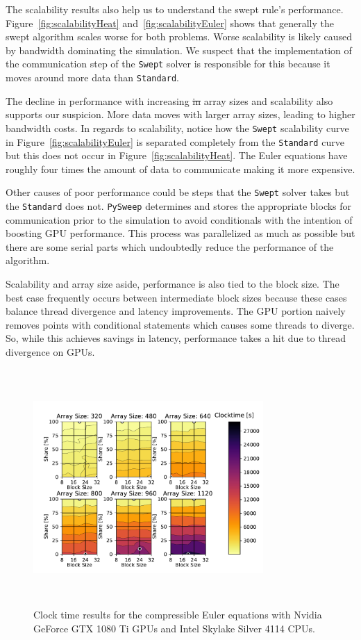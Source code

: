 \documentclass[preprints,article,accept,moreauthors,pdftex]{Definitions/mdpi}
\newcommand{\former}[2]{\sloppy\cbcolor{#2}\textcolor{#2}{\cbdelete\sout{#1}}}
\def\pysweep{\texttt{PySweep}}
\def\Swept{\texttt{Swept}}
\def\Standard{\texttt{Standard}}
\def\oldCPU{Intel Skylake Silver 4114} %
\def\oldGPU{Nvidia GeForce GTX 1080 Ti}
\begin{document}
The scalability results also help us to understand the swept rule's performance.
Figure~\ref{fig:scalabilityHeat} and~\ref{fig:scalabilityEuler} shows that generally the swept algorithm scales worse for both problems. Worse scalability is likely caused by bandwidth dominating the simulation. 
We suspect that the implementation of the communication step of the \Swept{} solver is responsible for this because it moves around more data than \Standard{}. 

The decline in performance with increasing \former{in}{revTypo} array sizes and scalability also supports our suspicion.
More data moves with larger array sizes, leading to higher bandwidth costs. In regards to scalability, notice how the \Swept{} scalability curve in Figure~\ref{fig:scalabilityEuler} is separated completely from the \Standard{} curve but this does not occur in Figure~\ref{fig:scalabilityHeat}. 
The Euler equations have roughly four times the amount of data to communicate making it more expensive. 

Other causes of poor performance could be steps that the \Swept{} solver takes but the \Standard{} does not. \pysweep{} determines and stores the appropriate blocks for communication prior to the simulation to avoid conditionals with the intention of boosting GPU performance. This process was parallelized as much as possible but there are some serial parts which undoubtedly reduce the performance of the algorithm. 

Scalability and array size aside, performance is also tied to the block size. The best case frequently occurs between intermediate block sizes because these cases balance thread divergence and latency improvements. The GPU portion naively removes points with conditional statements which causes some threads to diverge. 
So, while this achieves savings in latency, performance takes a hit due to thread divergence on GPUs.

\begin{figure}[htbp]
    \centering
    \includegraphics[height=9cm,width=0.78\textwidth, trim={0.5cm 0.4cm 0.5cm 0.2cm},clip]{figs/clockTimeSwepteulerOld.pdf}
    \caption{Clock time results  for the compressible Euler equations with \oldGPU{} GPUs and \oldCPU{} CPUs.}
    \label{fig:clocktimeOldEuler}
\end{figure}
\end{document}
